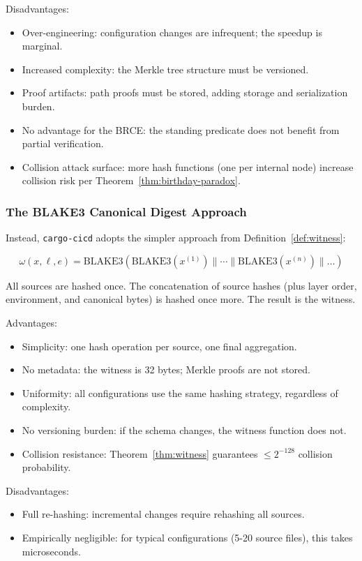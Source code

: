 Disadvantages:
\begin{itemize}
  \item Over-engineering: configuration changes are infrequent; the speedup is marginal.
  \item Increased complexity: the Merkle tree structure must be versioned.
  \item Proof artifacts: path proofs must be stored, adding storage and serialization burden.
  \item No advantage for the BRCE: the standing predicate does not benefit from partial verification.
  \item Collision attack surface: more hash functions (one per internal node) increase collision risk per Theorem~\ref{thm:birthday-paradox}.
\end{itemize}

\subsubsection{The BLAKE3 Canonical Digest Approach}

Instead, \texttt{cargo-cicd} adopts the simpler approach from Definition~\ref{def:witness}:

$$\omega(x, \ell, e) = \mathrm{BLAKE3}(\mathrm{BLAKE3}(x^{(1)}) \| \cdots \| \mathrm{BLAKE3}(x^{(n)}) \| \ldots)$$

All sources are hashed once. The concatenation of source hashes (plus layer order, environment, and canonical bytes) is hashed once more. The result is the witness.

Advantages:
\begin{itemize}
  \item Simplicity: one hash operation per source, one final aggregation.
  \item No metadata: the witness is 32 bytes; Merkle proofs are not stored.
  \item Uniformity: all configurations use the same hashing strategy, regardless of complexity.
  \item No versioning burden: if the schema changes, the witness function does not.
  \item Collision resistance: Theorem~\ref{thm:witness} guarantees $\leq 2^{-128}$ collision probability.
\end{itemize}

Disadvantages:
\begin{itemize}
  \item Full re-hashing: incremental changes require rehashing all sources.
  \item Empirically negligible: for typical configurations (5-20 source files), this takes microseconds.
\end{itemize}

